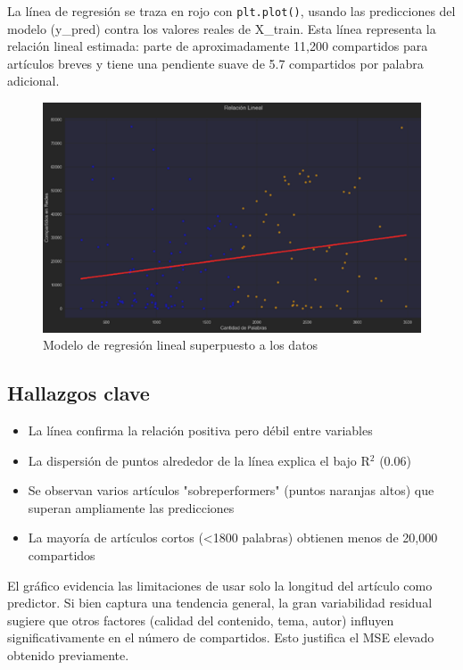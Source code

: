 \documentclass[12pt, a4paper]{article}
\begin{document}
La línea de regresión se traza en rojo con \texttt{plt.plot()}, usando las predicciones del modelo (y\_pred) contra los valores reales de X\_train. Esta línea representa la relación lineal estimada: parte de aproximadamente 11,200 compartidos para artículos breves y tiene una pendiente suave de 5.7 compartidos por palabra adicional.

\begin{figure}[H]
    \centering
    \includegraphics[width=1.0\textwidth]{Actividad-9/Imagen12.png}
    \caption{Modelo de regresión lineal superpuesto a los datos}
\end{figure}

\subsection{Hallazgos clave}
\begin{itemize}
    \item La línea confirma la relación positiva pero débil entre variables
    \item La dispersión de puntos alrededor de la línea explica el bajo R$^2$ (0.06)
    \item Se observan varios artículos "sobreperformers" (puntos naranjas altos) que superan ampliamente las predicciones
    \item La mayoría de artículos cortos (<1800 palabras) obtienen menos de 20,000 compartidos
\end{itemize}

El gráfico evidencia las limitaciones de usar solo la longitud del artículo como predictor. Si bien captura una tendencia general, la gran variabilidad residual sugiere que otros factores (calidad del contenido, tema, autor) influyen significativamente en el número de compartidos. Esto justifica el MSE elevado obtenido previamente.
\end{document}
